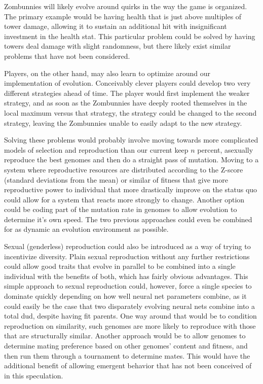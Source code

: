 \documentclass[letterpaper]{article}
\begin{document}
Zombunnies will likely evolve around quirks in the way the
game is organized. The primary example would be having health that is just above
multiples of tower damage, allowing it to sustain an additional hit with
insignificant investment in the health stat. This particular problem could be
solved by having towers deal damage with slight randomness, but there likely
exist similar problems that have not been considered.

Players, on the other hand, may also learn to optimize around our implementation
of evolution. Conceivably clever players could develop two very different
strategies ahead of time. The player would first implement the weaker strategy,
and as soon as the Zombunnies have deeply rooted themselves in the local maximum
versus that strategy, the strategy could be changed to the second strategy,
leaving the Zombunnies unable to easily adapt to the new strategy.

Solving these problems would probably involve moving towards more complicated
models of selection and reproduction than our current keep \(n\) percent,
asexually reproduce the best genomes and then do a straight pass of mutation.
Moving to a system where reproductive resources are distributed according to the
Z-score (standard deviations from the mean) or similar of fitness that give more
reproductive power to individual that more drastically improve on the status quo
could allow for a system that reacts more strongly to change. Another option
could be coding part of the mutation rate in genomes to allow evolution to
determine it's own speed. The two previous approaches could even be combined for
as dynamic an evolution environment as possible.

Sexual (genderless) reproduction could also be introduced as a way of trying to
incentivize diversity. Plain sexual reproduction without any further restrictions
could allow good traits that evolve in parallel to be combined into a single
individual with the benefits of both, which has fairly obvious advantages.
This simple approach to sexual reproduction could, however, force a single
species to dominate quickly depending on how well neural net parameters combine,
as it could easily be the case that two disparately evolving neural nets combine
into a total dud, despite having fit parents. One way around that would be to
condition reproduction on similarity, such genomes are more likely to reproduce
with those that are structurally similar. Another approach would be to allow
genomes to determine mating preference based on other genomes' content and
fitness, and then run them through a tournament to determine mates. This would
have the additional benefit of allowing emergent behavior that has not been
conceived of in this speculation.
\end{document}
